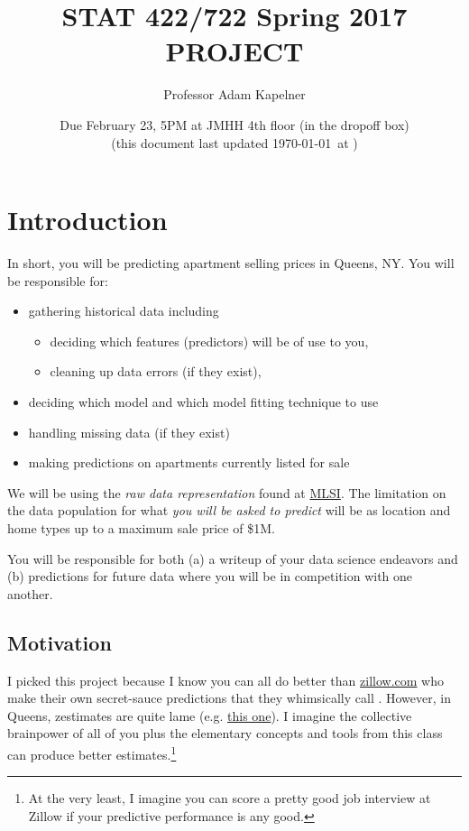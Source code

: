 \documentclass[12pt]{article}
\title{STAT 422/722 Spring 2017 PROJECT}
\author{Professor Adam Kapelner}
\date{Due February 23, 5PM at JMHH 4th floor (in the dropoff box)\\ \vspace{0.5cm} \footnotesize (this document last updated \today ~at \currenttime)}
\begin{document}
\maketitle

\section{Introduction}

In short, you will be predicting apartment selling prices in Queens, NY. You will be responsible for:

\begin{itemize}
\item gathering historical data including
\begin{itemize}
\item deciding which features (predictors) will be of use to you,
\item cleaning up data errors (if they exist),
\end{itemize}
\item deciding which model and which model fitting technique to use
\item handling missing data (if they exist)
\item making predictions on apartments currently listed for sale
\end{itemize}

We will be using the \emph{raw data representation} found at \href{http://www.mlsli.com/}{MLSI}. The limitation on the data population for what \emph{you will be asked to predict} will be  as location and home types  up to a maximum sale price of \$1M.

You will be responsible for both (a) a writeup of your data science endeavors and (b) predictions for future data where you will be in competition with one another.

\subsection{Motivation}

I picked this project because I know you can all do better than \url{zillow.com} who make their own secret-sauce predictions that they whimsically call . However, in Queens, zestimates are quite lame (e.g. \href{http://www.zillow.com/homes/recently_sold/Queens-New-York-NY/condo,apartment_duplex_type/2096496075_zpid/270915_rid/globalrelevanceex_sort/40.890158,-73.462143,40.452172,-74.200287_rect/10_zm/}{this one}). I imagine the collective brainpower of all of you plus the elementary concepts and tools from this class can produce better estimates.\footnote{At the very least, I imagine you can score a pretty good job interview at Zillow if your predictive performance is any good.}
\end{document}
